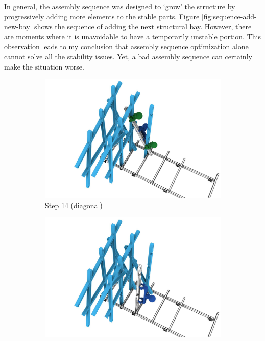 \FloatBarrier

In general, the assembly sequence was designed to ‘grow’ the structure by progressively adding more elements to the stable parts. Figure \ref{fig:sequence-add-new-bay} shows the sequence of adding the next structural bay. However, there are moments where it is unavoidable to have a temporarily unstable portion. This observation leads to my conclusion that assembly sequence optimization alone cannot solve all the stability issues. Yet, a bad assembly sequence can certainly make the situation worse.

\begin{figure}
    \centering
    \begin{subfigure}[b]{0.49\textwidth}
        \centering
        \includegraphics[width=\textwidth]{images/05/image25.jpg}
        \caption{Step 14 (diagonal)}
    \end{subfigure}
    \hfill
    \begin{subfigure}[b]{0.49\textwidth}
        \centering
        \includegraphics[width=\textwidth]{images/05/image63.jpg}

\end{subfigure}
\end{figure}
